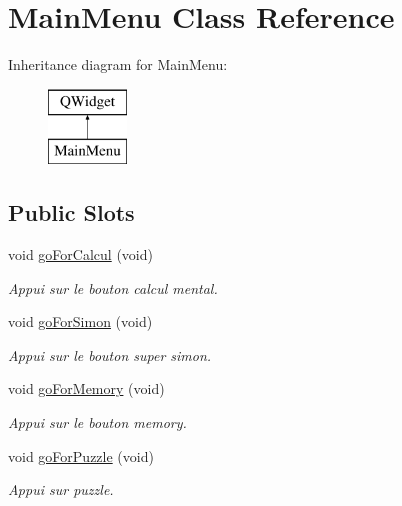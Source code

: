 \hypertarget{class_main_menu}{}\section{Main\+Menu Class Reference}
\label{class_main_menu}
Inheritance diagram for Main\+Menu\+:\begin{figure}[H]
\begin{center}
\leavevmode
\includegraphics[height=2.000000cm]{class_main_menu}
\end{center}
\end{figure}
\subsection*{Public Slots}
\begin{DoxyCompactItemize}
\item 
void \hyperlink{class_main_menu_aecda91a1fbea29f928cf2334d5c5b1f3}{go\+For\+Calcul} (void)
\begin{DoxyCompactList}\small\item\em Appui sur le bouton calcul mental. \end{DoxyCompactList}\item 
\mbox{\label{class_main_menu_a5f48134eefe4cc9e0a00922c4a09a647}} 
void \hyperlink{class_main_menu_a5f48134eefe4cc9e0a00922c4a09a647}{go\+For\+Simon} (void)
\begin{DoxyCompactList}\small\item\em Appui sur le bouton super simon. \end{DoxyCompactList}\item 
\mbox{\label{class_main_menu_acc85e8df6cc1cf76fac3dfa998fbabc0}} 
void \hyperlink{class_main_menu_acc85e8df6cc1cf76fac3dfa998fbabc0}{go\+For\+Memory} (void)
\begin{DoxyCompactList}\small\item\em Appui sur le bouton memory. \end{DoxyCompactList}\item 
void \hyperlink{class_main_menu_acacb97bab2a77bd09dedccea22a32116}{go\+For\+Puzzle} (void)
\begin{DoxyCompactList}\small\item\em Appui sur puzzle. \end{DoxyCompactList}\end{DoxyCompactItemize}
